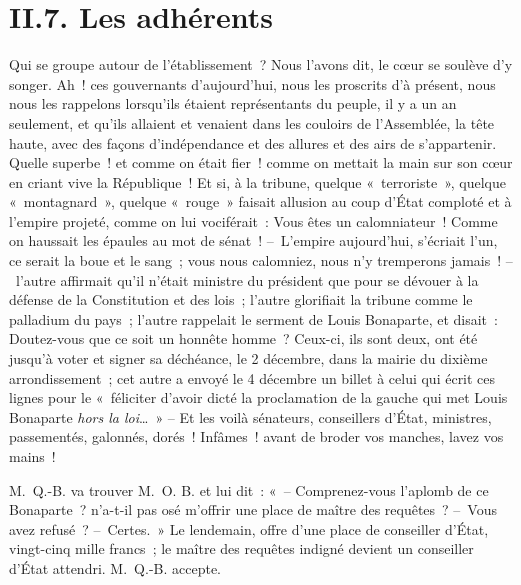 \documentclass[french,twoside]{book} %
\begin{document}
\section[{II.7. Les adhérents}]{II.7. Les adhérents}

\noindent Qui se groupe autour de l’établissement ? Nous l’avons dit, le cœur se soulève d’y songer. Ah ! ces gouvernants d’aujourd’hui, nous les proscrits d’à présent, nous nous les rappelons lorsqu’ils étaient représentants du peuple, il y a un an seulement, et qu’ils allaient et venaient dans les couloirs de l’Assemblée, la tête haute, avec des façons d’indépendance et des allures et des airs de s’appartenir. Quelle superbe ! et comme on était fier ! comme on mettait la main sur son cœur en criant vive la République ! Et si, à la tribune, quelque « terroriste », quelque « montagnard », quelque « rouge » faisait allusion au coup d’État comploté et à l’empire projeté, comme on lui vociférait : Vous êtes un calomniateur ! Comme on haussait les épaules au mot de sénat ! – L’empire aujourd’hui, s’écriait l’un, ce serait la boue et le sang ; vous nous calomniez, nous n’y tremperons jamais ! – l’autre affirmait qu’il n’était ministre du président que pour se dévouer à la défense de la Constitution et des lois ; l’autre glorifiait la tribune comme le palladium du pays ; l’autre rappelait le serment de Louis Bonaparte, et disait : Doutez-vous que ce soit un honnête homme ? Ceux-ci, ils sont deux, ont été jusqu’à voter et signer sa déchéance, le 2 décembre, dans la mairie du dixième arrondissement ; cet autre a envoyé le 4 décembre un billet à celui qui écrit ces lignes pour le « féliciter d’avoir dicté la proclamation de la gauche qui met Louis Bonaparte \emph{hors la loi}… » – Et les voilà sénateurs, conseillers d’État, ministres, passementés, galonnés, dorés ! Infâmes ! avant de broder vos manches, lavez vos mains !\par
M. Q.-B. va trouver M. O. B. et lui dit : « – Comprenez-vous l’aplomb de ce Bonaparte ? n’a-t-il pas osé m’offrir une place de maître des requêtes ? – Vous avez refusé ? – Certes. » Le lendemain, offre d’une place de conseiller d’État, vingt-cinq mille francs ; le maître des requêtes indigné devient un conseiller d’État attendri. M. Q.-B. accepte.\par
\end{document}
